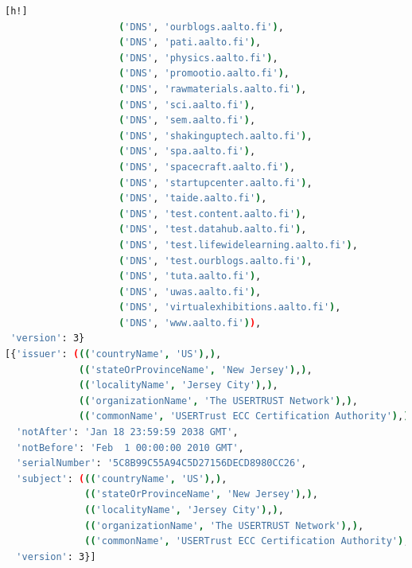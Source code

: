 \begin{lstlisting}[language=bash, caption= A TLS handshake connecting to
    \url{www.aalto.fi}., label={lst:handshake_aalto}][h!]
                    ('DNS', 'ourblogs.aalto.fi'),
                    ('DNS', 'pati.aalto.fi'),
                    ('DNS', 'physics.aalto.fi'),
                    ('DNS', 'promootio.aalto.fi'),
                    ('DNS', 'rawmaterials.aalto.fi'),
                    ('DNS', 'sci.aalto.fi'),
                    ('DNS', 'sem.aalto.fi'),
                    ('DNS', 'shakinguptech.aalto.fi'),
                    ('DNS', 'spa.aalto.fi'),
                    ('DNS', 'spacecraft.aalto.fi'),
                    ('DNS', 'startupcenter.aalto.fi'),
                    ('DNS', 'taide.aalto.fi'),
                    ('DNS', 'test.content.aalto.fi'),
                    ('DNS', 'test.datahub.aalto.fi'),
                    ('DNS', 'test.lifewidelearning.aalto.fi'),
                    ('DNS', 'test.ourblogs.aalto.fi'),
                    ('DNS', 'tuta.aalto.fi'),
                    ('DNS', 'uwas.aalto.fi'),
                    ('DNS', 'virtualexhibitions.aalto.fi'),
                    ('DNS', 'www.aalto.fi')),
 'version': 3}
[{'issuer': ((('countryName', 'US'),),
             (('stateOrProvinceName', 'New Jersey'),),
             (('localityName', 'Jersey City'),),
             (('organizationName', 'The USERTRUST Network'),),
             (('commonName', 'USERTrust ECC Certification Authority'),)),
  'notAfter': 'Jan 18 23:59:59 2038 GMT',
  'notBefore': 'Feb  1 00:00:00 2010 GMT',
  'serialNumber': '5C8B99C55A94C5D27156DECD8980CC26',
  'subject': ((('countryName', 'US'),),
              (('stateOrProvinceName', 'New Jersey'),),
              (('localityName', 'Jersey City'),),
              (('organizationName', 'The USERTRUST Network'),),
              (('commonName', 'USERTrust ECC Certification Authority'),)),
  'version': 3}]

\end{lstlisting}